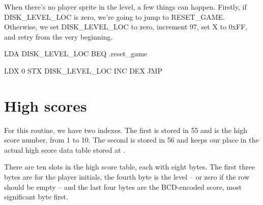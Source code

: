 \documentclass[10pt]{report}%
\begin{document}
When there's no player sprite in the level, a few things can happen. Firstly,
if {\Tt{}DISK{\_}LEVEL{\_}LOC\nwendquote} is zero, we're going to jump to {\Tt{}RESET{\_}GAME\nwendquote}. Otherwise, we set
{\Tt{}DISK{\_}LEVEL{\_}LOC\nwendquote} to zero, increment {\Tt{}{\nwbackslash}{\$}97\nwendquote}, set X to {\Tt{}0xFF\nwendquote},
and retry {\Tt{}\nwendquote} from the very beginning.

\nwenddocs{}\endmoddef\nwstartdeflinemarkup{}\nwenddeflinemarkup
    LDA     DISK_LEVEL_LOC
    BEQ     .reset_game

    LDX     0
    STX     DISK_LEVEL_LOC
    INC     
    DEX
    JMP     
\nwendcode{}\nwdocspar

\chapter{High scores}

For this routine, we have two indexes. The first is stored in {\Tt{}{\$}55\nwendquote} and is the high score
number, from 1 to 10. The second is stored in {\Tt{}{\$}56\nwendquote} and keeps our place in the actual
high score data table stored at {\Tt{}\nwendquote}.

There are ten slots in the high score table, each with eight bytes. The first three bytes are
for the player initials, the fourth byte is the level -- or zero if the row should be empty -- and
the last four bytes are the BCD-encoded score, most significant byte first.
\end{document}

